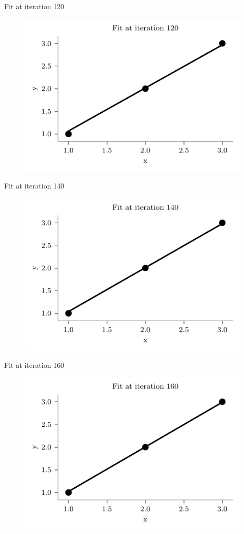 \documentclass{beamer}
\begin{document}
\begin{frame}{Fit at iteration 120}
\begin{figure}
	\centering
	\includegraphics[width=0.7\linewidth]{fit-iteration-120.pdf}
\end{figure}
\end{frame}

\begin{frame}{Fit at iteration 140}
\begin{figure}
	\centering
	\includegraphics[width=0.7\linewidth]{fit-iteration-140.pdf}
\end{figure}
\end{frame}

\begin{frame}{Fit at iteration 160}
\begin{figure}
	\centering
	\includegraphics[width=0.7\linewidth]{fit-iteration-160.pdf}
\end{figure}
\end{frame}
\end{document}
